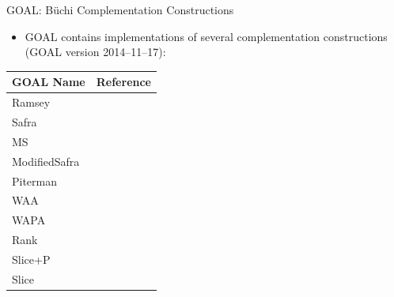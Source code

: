 \documentclass[12pt]{beamer}
\begin{document}
\begin{frame}{GOAL: Büchi Complementation Constructions}
\label{goal_constructions}
\begin{itemize}
\item GOAL contains implementations of several complementation constructions (GOAL version 2014--11--17):
\end{itemize}
\vspace{0.125cm}
\centering
\footnotesize
{\renewcommand{\arraystretch}{1.15}
\begin{tabular}{ll}
\hline
GOAL Name & Reference \\
\hline
Ramsey        & \cite{1985_sistla,PrasadSistla1987217} \\
Safra         & \cite{1988_safra_2,1988_safra_1} \\
MS            & \cite{Muller199569} \\
ModifiedSafra & \cite{2006_althoff} \\
Piterman      & \cite{2006_piterman,2007_piterman} \\
WAA           & \cite{1997_vardi,Kupferman:2001} \\
WAPA          & \cite{1999_thomas} \\
Rank          & \cite{schewe2009buchi} \\
Slice+P       & \cite{vardi2007automata} \\
Slice         & \cite{2008_kaehler} \\
\hline
\end{tabular}}
\end{frame}


\newcommand{\imgshade}[1]{
\tikz \node[inner sep=0,opacity=0.3]{\texttt{[image: \#1]}};}
\newcommand{\imgfull}[1]{
\tikz \node[inner sep=0,opacity=1]{\texttt{[image: \#1]}};}
\end{document}
